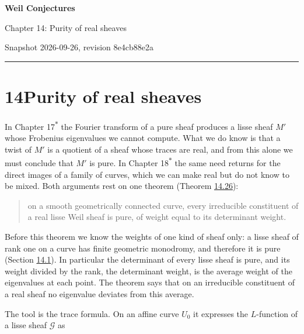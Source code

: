 \documentclass[11pt]{article}
\newcommand{\bpout}[1]{#1\textsuperscript{\hyperlink{bp-outside}{\ensuremath{\ast}}}}
\begin{document}
\pagestyle{plain}
\begin{center}
{\LARGE\bfseries Weil Conjectures\par}
\vspace{0.7em}
{\large Chapter 14: Purity of real sheaves\par}
\vspace{0.5em}
{\small\color{bpmuted}Snapshot 2026-09-26, revision 8e4cb88e2a\par}
\end{center}
\vspace{0.5em}
{\small\tableofcontents}
\bigskip\hrule\bigskip

\section*{\texorpdfstring{14\quad Purity of real sheaves}{14 Purity of real sheaves}}
\label{bp1}%
\label{bp2}%
In Chapter \bpout{17} the Fourier transform of a pure sheaf produces a lisse sheaf \(M'\) whose Frobenius eigenvalues we cannot compute. What we do know is that a twist of \(M'\) is a quotient of a sheaf whose traces are real, and from this alone we must conclude that \(M'\) is pure. In Chapter \bpout{18} the same need returns for the direct images of a family of curves, which we can make real but do not know to be mixed. Both arguments rest on one theorem (Theorem \hyperref[bp82]{14.26}):

\begin{quote}
on a smooth geometrically connected curve, every irreducible constituent of a real lisse Weil sheaf is pure, of weight equal to its determinant weight.
\end{quote}

Before this theorem we know the weights of one kind of sheaf only: a lisse sheaf of rank one on a curve has finite geometric monodromy, and therefore it is pure (Section \hyperref[bp3]{14.1}). In particular the determinant of every lisse sheaf is pure, and its weight divided by the rank, the determinant weight, is the average weight of the eigenvalues at each point. The theorem says that on an irreducible constituent of a real sheaf no eigenvalue deviates from this average.

The tool is the trace formula. On an affine curve \(U_0\) it expresses the \(L\)-function of a lisse sheaf \(\mathcal G\) as
\end{document}

